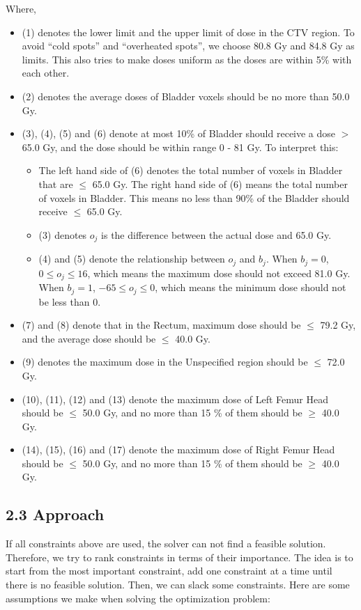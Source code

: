 \documentclass{report}
\begin{document}
Where,
\begin{itemize}
    \item (1) denotes the lower limit and the upper limit of dose in the CTV region. To avoid ``cold spots'' and ``overheated spots'', we choose 80.8 Gy and 84.8 Gy as limits. This also tries to make doses uniform as the doses are within 5\% with each other.
    \item (2) denotes the average doses of Bladder voxels should be no more than 50.0 Gy.
    \item (3), (4), (5) and (6) denote at most 10\% of Bladder should receive a dose $>$ 65.0 Gy, and the dose should be within range 0 - 81 Gy. To interpret this:
    \begin{itemize}
        \item The left hand side of (6) denotes the total number of voxels in Bladder that are $\leq$ 65.0 Gy. The right hand side of (6) means the total number of voxels in Bladder. This means no less than 90\% of the Bladder should receive $\leq$ 65.0 Gy.
        \item (3) denotes $o_j$ is the difference between the actual dose and 65.0 Gy.
        \item (4) and (5) denote the relationship between $o_j$ and $b_j$. When $b_j = 0$, $0 \leq o_j \leq 16$, which means the maximum dose should not exceed 81.0 Gy. When $b_j = 1$, $-65 \leq o_j \leq 0$, which means the minimum dose should not be less than 0.
    \end{itemize}
    \item (7) and (8) denote that in the Rectum, maximum dose should be $\leq$ 79.2 Gy, and the average dose should be $\leq$ 40.0 Gy.
    \item (9) denotes the maximum dose in the Unspecified region should be $\leq$ 72.0 Gy.
    \item (10), (11), (12) and (13) denote the maximum dose of Left Femur Head should be $\leq$ 50.0 Gy, and no more than 15 \% of them should be $\geq$ 40.0 Gy.
    \item (14), (15), (16) and (17) denote the maximum dose of Right Femur Head should be $\leq$ 50.0 Gy, and no more than 15 \% of them should be $\geq$ 40.0 Gy.

\end{itemize}

\subsection{2.3 Approach}
If all constraints above are used, the solver can not find a feasible solution. Therefore, we 
try to rank constraints in terms of their importance. The idea is to start from the most important constraint, add one constraint at a time until there is no feasible solution. Then, we can slack some constraints. Here are some assumptions we make when solving the optimization problem:
\end{document}
